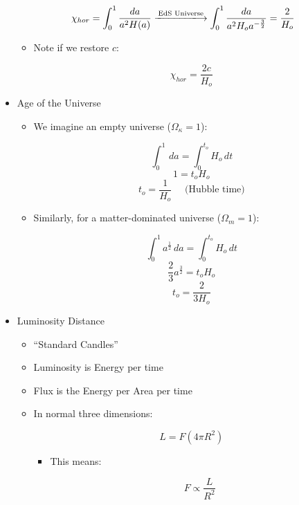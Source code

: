 \begin{itemize}
    $$\chi_{hor}=\int_0^1\frac{da}{a^2H(a)}\xlongrightarrow{\text{EdS Universe}}\int_0^1\frac{da}{a^2H_oa^{-\frac{3}{2}}}=\frac{2}{H_o}$$

    \begin{itemize}
        
      \item Note if we restore $c$:

        $$\chi_{hor}=\frac{2c}{H_o}$$

    \end{itemize}
    
  \item Age of the Universe

    \begin{itemize}

      \item We imagine an empty universe ($\Omega_{\kappa}=1$):

        $$\int_0^1\,da=\int_0^{t_o}H_o\,dt$$
        $$1=t_oH_o$$
        $$t_o=\frac{1}{H_o}\quad\text{ (Hubble time)}$$

      \item Similarly, for a matter-dominated universe ($\Omega_m=1$):

        $$\int_0^1 a^{\frac{1}{2}}\,da=\int_0^{t_o}H_o\,dt$$
        $$\frac{2}{3}a^{\frac{3}{2}}=t_oH_o$$
        $$t_o=\frac{2}{3H_o}$$

    \end{itemize}

  \item Luminosity Distance

    \begin{itemize}

      \item ``Standard Candles''

      \item Luminosity is Energy per time

      \item Flux is the Energy per Area per time

      \item In normal three dimensions:

        $$L=F(4\pi R^2)$$

        \begin{itemize}

          \item This means:

            $$F\propto \frac{L}{R^2}$$

        \end{itemize}


\end{itemize}
\end{itemize}
